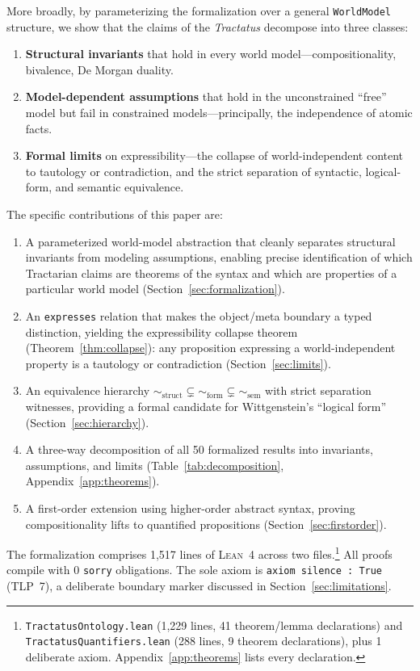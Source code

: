 \documentclass[10pt, letterpaper]{article}
\theoremstyle{definition}
\theoremstyle{remark}
\newcommand{\structEq}{\sim_{\mathrm{struct}}}
\newcommand{\formEq}{\sim_{\mathrm{form}}}
\newcommand{\semEq}{\sim_{\mathrm{sem}}}
\newcommand{\Lean}{\textsc{Lean}}
\begin{document}
More broadly, by parameterizing the formalization over a general
\texttt{WorldModel} structure, we show that the claims of the
\emph{Tractatus} decompose into three classes:
\begin{enumerate}[nosep]
  \item \textbf{Structural invariants} that hold in every world
    model---compositionality, bivalence, De Morgan duality.
  \item \textbf{Model-dependent assumptions} that hold in the
    unconstrained ``free'' model but fail in constrained
    models---principally, the independence of atomic facts.
  \item \textbf{Formal limits} on expressibility---the collapse
    of world-independent content to tautology or contradiction,
    and the strict separation of syntactic, logical-form, and
    semantic equivalence.
\end{enumerate}

\noindent
The specific contributions of this paper are:
\begin{enumerate}[nosep, label=(\arabic*)]
  \item A parameterized world-model abstraction that cleanly
    separates structural invariants from modeling assumptions,
    enabling precise identification of which Tractarian claims
    are theorems of the syntax and which are properties of a
    particular world model (Section~\ref{sec:formalization}).
  \item An \texttt{expresses} relation that makes the object/meta
    boundary a typed distinction, yielding the expressibility
    collapse theorem (Theorem~\ref{thm:collapse}): any proposition
    expressing a world-independent property is a tautology or
    contradiction (Section~\ref{sec:limits}).
  \item An equivalence hierarchy $\structEq \subsetneq \formEq
    \subsetneq \semEq$ with strict separation witnesses, providing
    a formal candidate for Wittgenstein's ``logical form''
    (Section~\ref{sec:hierarchy}).
  \item A three-way decomposition of all 50 formalized results
    into invariants, assumptions, and limits
    (Table~\ref{tab:decomposition}, Appendix~\ref{app:theorems}).
  \item A first-order extension using higher-order abstract syntax,
    proving compositionality lifts to quantified propositions
    (Section~\ref{sec:firstorder}).
\end{enumerate}

\noindent
The formalization comprises 1,517 lines of \Lean~4 across two
files.\footnote{%
  \texttt{TractatusOntology.lean} (1,229 lines, 41 theorem/lemma
  declarations) and \texttt{TractatusQuantifiers.lean} (288 lines,
  9 theorem declarations), plus 1 deliberate axiom.
  Appendix~\ref{app:theorems} lists every declaration.}
All proofs compile with 0 \texttt{sorry} obligations.
The sole axiom is \texttt{axiom silence : True} (TLP~7), a
deliberate boundary marker discussed in
Section~\ref{sec:limitations}.
\end{document}
